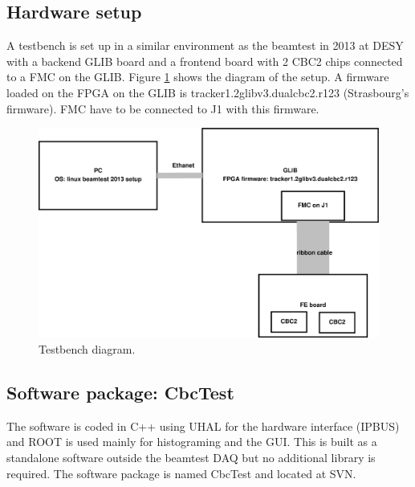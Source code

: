 \documentclass[11pt,a4paper]{article}
\begin{document}
	\subsection{Hardware setup}
	A testbench is set up in a similar environment as the beamtest in 2013 at DESY with a backend GLIB\cite{GLIB} board and a frontend board with 2 CBC2 chips connected to a FMC on the GLIB.
	Figure \ref{fig:testbench} shows the diagram of the setup.  A firmware loaded on the FPGA on the GLIB is tracker1.2glibv3.dualcbc2.r123 (Strasbourg's firmware)\cite{FIRMWARE}.  FMC have to be connected to J1 with this firmware.

	\begin{figure}[htbp]
	\centering
	\includegraphics[width=\textwidth]{fig/TestBench.eps}
	\caption{Testbench diagram. }\label{fig:testbench}
	\end{figure}

	\subsection{Software package: CbcTest}
	The software is coded in C++ using UHAL\cite{UHAL} for the hardware interface (IPBUS) and ROOT\cite{ROOT} is used mainly for histograming and the GUI. 
	This is built as a standalone software outside the beamtest DAQ but no additional library is required. The software package is named CbcTest and located at SVN\cite{CBCTEST}. 
\end{document}
